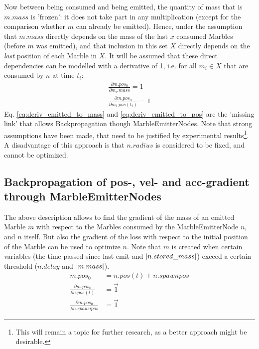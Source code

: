 Now between being consumed and being emitted, the quantity of mass that is $m.mass$ is 'frozen': it does not take part in any multiplication (except for the comparison whether $m$ can already be emitted). Hence, under the assumption that $m.mass$ directly depends on the mass of the last $x$ consumed Marbles (before $m$ was emitted), and that inclusion in this set $X$ directly depends on the \textit{last} position of each Marble in $X$. It will be assumed that these direct dependencies can be modelled with a derivative of 1, i.e. for all $m_i \in X$ that are consumed by $n$ at time $t_i$:
\begin{align}
    \frac{\partial m.pos_0}{\partial m_i.mass} = 1 \label{eq:deriv_emitted_to_mass}\\
    \frac{\partial m.pos_0}{\partial m_i.pos(t_i)} = 1 \label{eq:deriv_emitted_to_pos}
\end{align}
Eq. \eqref{eq:deriv_emitted_to_mass} and \eqref{eq:deriv_emitted_to_pos} are the 'missing link' that allows Backpropagation though MarbleEmitterNodes. Note that strong assumptions have been made, that need to be justified by experimental results\footnote{This will remain a topic for further research, as a better approach might be desirable.}. 
A disadvantage of this approach is that $n.radius$ is considered to be fixed, and cannot be optimized.


\subsection{Backpropagation of pos-, vel- and acc-gradient through MarbleEmitterNodes}
The above description allows to find the gradient of the mass of an emitted Marble $m$ with respect to the Marbles consumed by the MarbleEmitterNode $n$, and $n$ itself. But also the gradient of the loss with respect to the initial position of the Marble can be used to optimize $n$. Note that $m$ is created when certain variables (the time passed since last emit and $\lvert n.stored\_mass \rvert$) exceed a certain threshold ($n.delay$ and $\lvert m.mass \rvert$). 
\begin{align}
    m.pos_0 &= n.pos(t) + n.spawnpos \\
    \frac{\partial m.pos_0}{\partial n.pos(t)} &= \vec{1} \\
    \frac{\partial m.pos_0}{\partial n.spawnpos} &= \vec{1}
\end{align}

